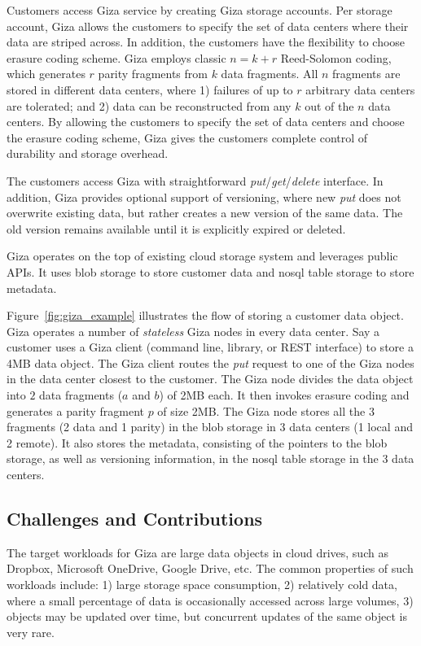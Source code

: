 Customers access Giza service by creating Giza storage accounts. Per storage account, Giza allows the customers to specify the set of data centers where their data are striped across. In addition, the customers have the flexibility to choose erasure coding scheme. Giza employs classic $n = k + r$ Reed-Solomon coding, which generates $r$ parity fragments from $k$ data fragments. All $n$ fragments are stored in different data centers, where 1) failures of up to $r$ arbitrary data centers are tolerated; and 2) data can be reconstructed from any $k$ out of the $n$ data centers. By allowing the customers to specify the set of data centers and choose the erasure coding scheme, Giza gives the customers complete control of durability and storage overhead.

The customers access Giza with straightforward {\em put}/{\em get}/{\em delete} interface. In addition, Giza provides optional support of versioning, where new {\em put} does not overwrite existing data, but rather creates a new version of the same data. The old version remains available until it is explicitly expired or deleted.

Giza operates on the top of existing cloud storage system and leverages public APIs. It uses blob storage to store customer data and nosql table storage to store metadata.

Figure~\ref{fig:giza_example} illustrates the flow of storing a customer data object. Giza operates a number of {\em stateless} Giza nodes in every data center. Say a customer uses a Giza client (command line, library, or REST interface) to store a 4MB data object. The Giza client routes the {\em put} request to one of the Giza nodes in the data center closest to the customer. The Giza node divides the data object into $2$ data fragments ($a$ and $b$) of 2MB each. It then invokes erasure coding and generates a parity fragment $p$ of size 2MB. The Giza node stores all the $3$ fragments (2 data and 1 parity) in the blob storage in 3 data centers (1 local and 2 remote). It also stores the metadata, consisting of the pointers to the blob storage, as well as versioning information, in the nosql table storage in the 3 data centers.

\subsection{Challenges and Contributions}

The target workloads for Giza are large data objects in cloud drives, such as Dropbox, Microsoft OneDrive, Google Drive, etc. The common properties of such workloads include: 1) large storage space consumption, 2) relatively cold data, where a small percentage of data is occasionally accessed across large volumes, 3) objects may be updated over time, but concurrent updates of the same object is very rare.

